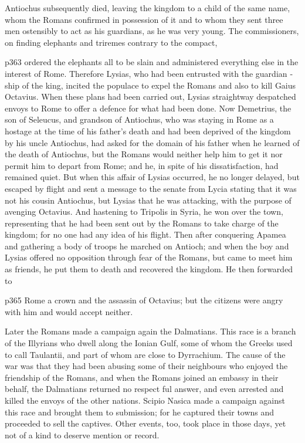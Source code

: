 Antiochus subsequently died, leaving the kingdom to a child of the same name, whom the Romans confirmed in possession of it and to whom they sent three men ostensibly to act as his guardians, as he was very young. The commissioners, on finding elephants and triremes contrary to the compact,

p363 ordered the elephants all to be slain and administered everything else in the interest of Rome. Therefore Lysias, who had been entrusted with the guardian ­ship of the king, incited the populace to expel the Romans and also to kill Gaius Octavius. When these plans had been carried out, Lysias straightway despatched envoys to Rome to offer a defence for what had been done. Now Demetrius, the son of Seleucus, and grandson of Antiochus, who was staying in Rome as a hostage at the time of his father's death and had been deprived of the kingdom by his uncle Antiochus, had asked for the domain of his father when he learned of the death of Antiochus, but the Romans would neither help him to get it nor permit him to depart from Rome; and he, in spite of his dissatisfaction, had remained quiet. But when this affair of Lysias occurred, he no longer delayed, but escaped by flight and sent a message to the senate from Lycia stating that it was not his cousin Antiochus, but Lysias that he was attacking, with the purpose of avenging Octavius. And hastening to Tripolis in Syria, he won over the town, representing that he had been sent out by the Romans to take charge of the kingdom; for no one had any idea of his flight. Then after conquering Apamea and gathering a body of troops he marched on Antioch; and when the boy and Lysias offered no opposition through fear of the Romans, but came to meet him as friends, he put them to death and recovered the kingdom. He then forwarded to

p365 Rome a crown and the assassin of Octavius; but the citizens were angry with him and would accept neither.

Later the Romans made a campaign again the Dalmatians. This race is a branch of the Illyrians who dwell along the Ionian Gulf, some of whom the Greeks used to call Taulantii, and part of whom are close to Dyrrachium. The cause of the war was that they had been abusing some of their neighbours who enjoyed the friendship of the Romans, and when the Romans joined an embassy in their behalf, the Dalmatians returned no respect ­ful answer, and even arrested and killed the envoys of the other nations. Scipio Nasica made a campaign against this race and brought them to submission; for he captured their towns and proceeded to sell the captives. Other events, too, took place in those days, yet not of a kind to deserve mention or record.

